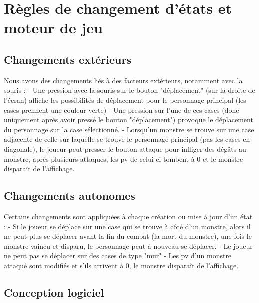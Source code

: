 \documentclass[a4paper,12pt]{article}
\begin{document}
\clearpage
\section{Règles de changement d'états et moteur de jeu}

\subsection{Changements extérieurs}

Nous avons des changements liés à des facteurs extérieurs, notamment avec la souris : 
- Une pression avec la souris sur le bouton "déplacement" (sur la droite de l'écran) affiche les possibilités de déplacement pour le personnage principal (les cases prennent une couleur verte)
- Une pression sur l'une de ces cases (donc uniquement après avoir pressé le bouton "déplacement") provoque le déplacement du personnage sur la case sélectionné.
- Lorsqu'un monstre se trouve sur une case adjacente de celle sur laquelle se trouve le personnage principal (pas les cases en diagonale), le joueur peut presser le bouton attaque pour infliger des dégâts au monstre, après plusieurs attaques, les pv de celui-ci tombent à 0 et le monstre disparaît de l'affichage.

\subsection{Changements autonomes}

Certains changements sont appliquées à chaque création ou mise à jour d'un état :
- Si le joueur se déplace sur une case qui se trouve à côté d'un monstre, alors il ne peut plus se déplacer avant la fin du combat (la mort du monstre), une fois le monstre vaincu et disparu, le personnage peut à nouveau se déplacer.
- Le joueur ne peut pas se déplacer sur des cases de type "mur"
- Les pv d'un monstre attaqué sont modifiés et s'ils arrivent à 0, le monstre disparaît de l'affichage.

\subsection{Conception logiciel}
\end{document}
